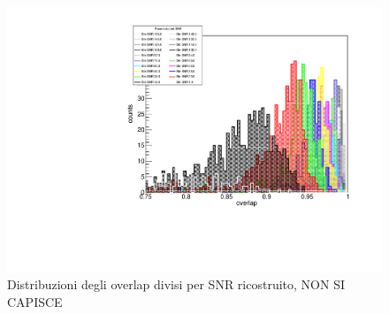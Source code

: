 \begin{figure}
	\vspace{-10pt}
	\begin{center}
		\includegraphics[width=.33\textwidth]{figures/Capitolo_4/report/OverlapDistributionsALLDetector1APR4_q09.pdf}
	\end{center}
	\vspace{-12pt}
	\caption{Distribuzioni degli overlap divisi per SNR ricostruito, NON SI CAPISCE}
	\label{fig:overlaps_histo}
	\vspace{-15pt}
\end{figure}
